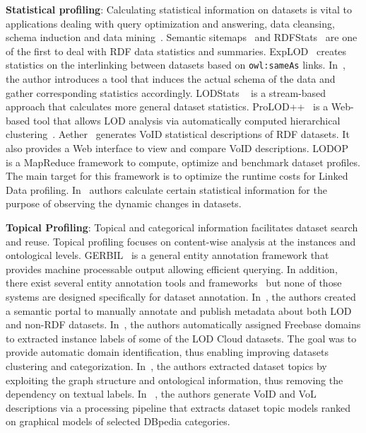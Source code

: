 \textbf{Statistical profiling}: Calculating statistical information on datasets is vital to applications dealing with query optimization and answering, data cleansing, schema induction and data mining~\cite{Jentzsch:ISWC:14,Frosterus:Springer:11,Lalithsena:WI:13}. Semantic sitemaps~\cite{Cyganiak:ESWC:08} and RDFStats~\cite{Lanegger:DEXA:09} are one of the first to deal with RDF data statistics and summaries. ExpLOD~\cite{Khatchadourian:ESWC:10} creates statistics on the interlinking between datasets based on \texttt{owl:sameAs} links. In~\cite{Li:WISM:12}, the author introduces a tool that induces the actual schema of the data and gather corresponding statistics accordingly. LODStats ~\cite{Auer:EKAW:12} is a stream-based approach that calculates more general dataset statistics. ProLOD++~\cite{Abedjan:ICDE:14} is a Web-based tool that allows LOD analysis via automatically computed hierarchical clustering~\cite{Bohm:ICDEW:10}. Aether~\cite{Makela:ESWC:14} generates VoID statistical descriptions of RDF datasets. It also provides a Web interface to view and compare VoID descriptions. LODOP~\cite{Forchhammer:PROFILES:14} is a MapReduce framework to compute, optimize and benchmark dataset profiles. The main target for this framework is to optimize the runtime costs for Linked Data profiling. In~\cite{Kaafer:ESWC:13} authors calculate certain statistical information for the purpose of observing the dynamic changes in datasets.

\textbf{Topical Profiling}: Topical and categorical information facilitates dataset search and reuse. Topical profiling focuses on content-wise analysis at the instances and ontological levels. GERBIL~\cite{Usbeck:WWW:15} is a general entity annotation framework that provides machine processable output allowing efficient querying. In addition, there exist several entity annotation tools and frameworks~\cite{Cornolti:WWW:13} but none of those systems are designed specifically for dataset annotation. In~\cite{Frosterus:ESWC:11}, the authors created a semantic portal to manually annotate and publish metadata about both LOD and non-RDF datasets. In~\cite{Lalithsena:WI:13}, the authors automatically assigned Freebase domains to extracted instance labels of some of the LOD Cloud datasets. The goal was to provide automatic domain identification, thus enabling improving datasets clustering and categorization. In~\cite{Bohm:CIKM:12}, the authors extracted dataset topics by exploiting the graph structure and ontological information, thus removing the dependency on textual labels. In ~\cite{Fetahu:ESWC:14}, the authors generate VoID and VoL descriptions via a processing pipeline that extracts dataset topic models ranked on graphical models of selected DBpedia categories.

